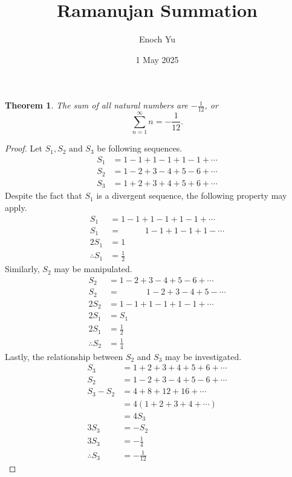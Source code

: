 \documentclass{article}
\title{Ramanujan Summation}
\author{Enoch Yu}
\date{1 May 2025}
\newtheorem*{theorem*}{Theorem}
\begin{document}
\begin{theorem*}
The sum of all natural numbers are $-\frac{1}{12}$, or
\[
\sum_{n=1}^{\infty}n=-\frac{1}{12}.
\]
\end{theorem*}
\begin{proof}
Let $S_1,S_2\text{ and }S_3$ be following sequences.
\begin{align*}
    S_1 &= 1 - 1 + 1 - 1 + 1 - 1 + \cdots \\
    S_2 &= 1 - 2 + 3 - 4 + 5 - 6 + \cdots \\
    S_3 &= 1 + 2 + 3 + 4 + 5 + 6 + \cdots
\end{align*}
Despite the fact that $S_1$ is a divergent sequence,
the following property may apply.
\begin{align*}
    S_1 &= 1 - 1 + 1 - 1 + 1 - 1 + \cdots \\
    S_1 &= \,\,\,\,\,\text{ }\text{ }\text{ }
        1 - 1 + 1 - 1 + 1 - \cdots \\
    2S_1 &= 1 \\
    \therefore
    S_1 &= \frac{1}{2}
\end{align*}
Similarly, $S_2$ may be manipulated.
\begin{align*}
    S_2 &= 1 - 2 + 3 - 4 + 5 - 6 + \cdots \\
    S_2 &= \,\,\,\text{ }\text{ }\text{ }\text{ }
        1 - 2 + 3 - 4 + 5 - \cdots \\
    2S_2 &= 1 - 1 + 1 - 1 + 1 - 1 + \cdots \\
    2S_1 &= S_1 \\
    2S_1 &= \frac{1}{2} \\
    \therefore
    S_2 &= \frac{1}{4}
\end{align*}
Lastly, the relationship between $S_2$
and $S_3$ may be investigated.
\begin{align*}
    S_3 &= 1 + 2 + 3 + 4 + 5 + 6 + \cdots \\
    S_2 &= 1 - 2 + 3 - 4 + 5 - 6 + \cdots \\
    S_3 - S_2 &= 4 + 8 + 1 2 + 16 + \cdots \\
    &= 4(1 + 2 + 3 + 4 + \cdots) \\
    &= 4S_3 \\
    3S_3 &= -S_2 \\
    3S_3 &= -\frac{1}{4} \\
    \therefore
    S_3& = -\frac{1}{12}
\end{align*}
\end{proof}
\end{document}
